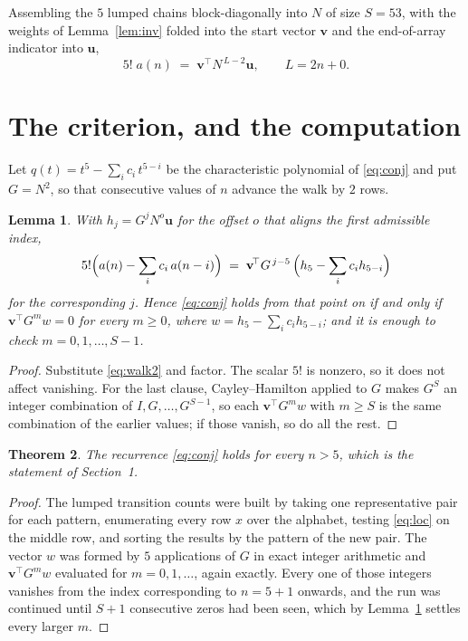 \documentclass[11pt,a4paper]{article}
\theoremstyle{plain}
\newtheorem{theorem}{Theorem}
\newtheorem{lemma}[theorem]{Lemma}
\theoremstyle{definition}
\begin{document}
Assembling the $5$ lumped chains block-diagonally into $N$ of size $S=53$, with the
weights of Lemma~\ref{lem:inv} folded into the start vector $\mathbf{v}$ and the
end-of-array indicator into $\mathbf{u}$,
\begin{equation}\label{eq:walk2}
5!\;a(n)\;=\;\mathbf{v}^{\!\top}N^{\,L-2}\mathbf{u},\qquad L=2n+0 .
\end{equation}

\section{The criterion, and the computation}

Let $q(t)=t^{5}-\sum_i c_i\,t^{5-i}$ be the characteristic polynomial of
\eqref{eq:conj} and put $G=N^{2}$, so that consecutive values of $n$ advance the
walk by $2$ rows.

\begin{lemma}\label{lem:crit}
With $h_j=G^{j}N^{o}\mathbf{u}$ for the offset $o$ that aligns the first admissible
index,
\[
5!\Bigl(a(n)-\sum_i c_i\,a(n-i)\Bigr)\;=\;\mathbf{v}^{\!\top}G^{\,j-5}\,
\Bigl(h_{5}-\sum_i c_i h_{5-i}\Bigr)
\]
for the corresponding $j$. Hence \eqref{eq:conj} holds from that point on if and only if
$\mathbf{v}^{\!\top}G^{m}w=0$ for every $m\ge0$, where
$w=h_{5}-\sum_i c_ih_{5-i}$; and it is enough to check $m=0,1,\dots,S-1$.
\end{lemma}

\begin{proof}
Substitute \eqref{eq:walk2} and factor. The scalar $5!$ is nonzero, so it does not
affect vanishing. For the last clause, Cayley--Hamilton applied to $G$ makes $G^{S}$ an
integer combination of $I,G,\dots,G^{S-1}$, so each $\mathbf{v}^{\!\top}G^{m}w$ with
$m\ge S$ is the same combination of the earlier values; if those vanish, so do all the rest.
\end{proof}

\begin{theorem}
The recurrence \eqref{eq:conj} holds for every $n>5$, which is the statement of
Section~1.
\end{theorem}

\begin{proof}
The lumped transition counts were built by taking one representative pair for each pattern,
enumerating every row $x$ over the alphabet, testing \eqref{eq:loc} on the middle
row, and sorting the results by the pattern of the new pair. The vector $w$ was formed by
$5$ applications of $G$ in exact integer arithmetic and $\mathbf{v}^{\!\top}G^{m}w$
evaluated for $m=0,1,\dots$, again exactly. Every one of those integers vanishes from the
index corresponding to $n=5+1$ onwards, and the run was continued until $S+1$
consecutive zeros had been seen, which by Lemma~\ref{lem:crit} settles every larger $m$.
\end{proof}
\end{document}
